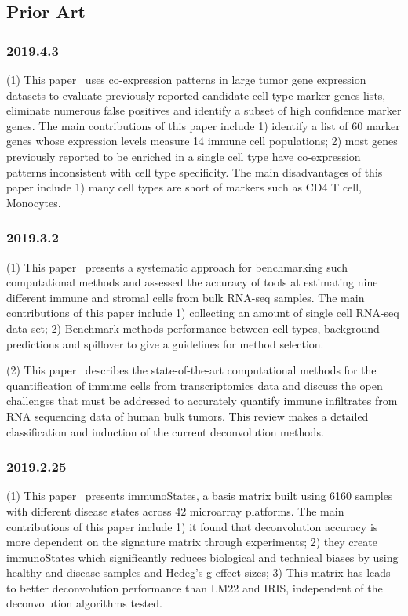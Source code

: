 \documentclass{article}
\begin{document}
\subsection{Prior Art}

\subsubsection{2019.4.3}
(1) This paper~\cite{Danaher2017} uses co-expression patterns in large tumor gene expression datasets to evaluate previously reported candidate cell type marker genes lists, eliminate numerous false positives and identify a subset of high confidence marker genes. The main contributions of this paper include 1) identify a list of 60 marker genes whose expression levels measure 14 immune cell populations; 2) most genes previously reported to be enriched in a single cell type have co-expression patterns inconsistent with cell type specificity. The main disadvantages of this paper include 1) many cell types are short of markers such as CD4 T cell, Monocytes.

\subsubsection{2019.3.2}
(1) This paper~\cite{Sturm463828} presents a systematic approach for benchmarking such computational methods and assessed the accuracy of tools at estimating nine different immune and stromal cells from bulk RNA-seq samples. The main contributions of this paper include 1) collecting an amount of single cell RNA-seq data set; 2) Benchmark methods performance between cell types, background predictions and spillover to give a guidelines for method selection.

(2) This paper~\cite{Finotello2018Quantifying} describes the state-of-the-art computational methods for the quantification of immune cells from transcriptomics data and discuss the open challenges that must be addressed to accurately quantify immune infiltrates from RNA sequencing data of human bulk tumors. This review makes a detailed classification and induction of the current deconvolution methods.

\subsubsection{2019.2.25}
(1) This paper~\cite{Vallania206466} presents immunoStates, a basis matrix built using 6160 samples with different disease states across 42 microarray platforms. The main contributions of this paper include 1) it found that deconvolution accuracy is more dependent on the signature matrix through experiments; 2) they create immunoStates which significantly reduces biological and technical biases by using healthy and disease samples and Hedeg's g effect sizes; 3) This matrix has leads to better deconvolution performance than LM22 and IRIS, independent of the deconvolution algorithms tested.
\end{document}
